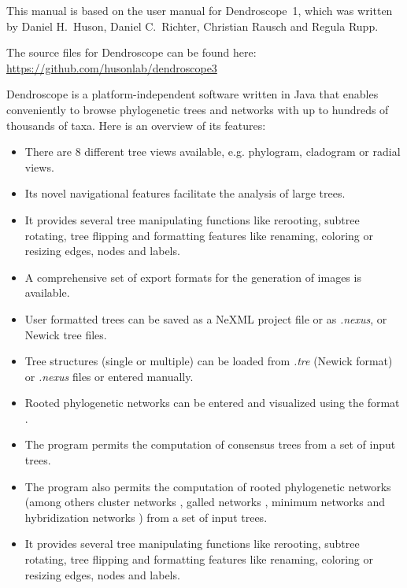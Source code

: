 \documentclass[11pt]{article}
\def\Dendroscope{{\sf Dendroscope }}
\begin{document}
This manual is based on the user manual for Dendroscope~1, which was written by
Daniel H.~Huson, Daniel C.~Richter, Christian Rausch and Regula Rupp.

The source files for \Dendroscope can be found here: \url{https://github.com/husonlab/dendroscope3}

\Dendroscope is a platform-independent software written in Java that enables conveniently to 
browse phylogenetic trees  and networks with up to hundreds of thousands of taxa.
Here is an overview of its features:
\begin{itemize}
\item There are 8 different tree views available, e.g. phylogram, cladogram or radial views.
\item Its novel navigational features facilitate the analysis of large trees.
\item It provides several tree manipulating functions like 
rerooting, subtree rotating, tree flipping and formatting features like renaming,
coloring or resizing edges, nodes and labels. 
\item A comprehensive set of export formats for the generation of images is available.
\item User formatted trees can be saved as a NeXML project file or as \textit{.nexus}, or Newick tree files. 
\item Tree structures (single or multiple) can be loaded from  \textit{.tre} (Newick format) or \textit{.nexus} files or entered manually.
\item Rooted phylogenetic networks can be entered and visualized using the  format \cite{Cardona2008}.
\item 
The program permits the computation of consensus trees  from a set of input trees.
\item The program also permits  the computation of rooted phylogenetic networks (among others cluster networks \cite{ClusterNetworks2008}, {galled networks} \cite{GalledNetworks2009}, {minimum networks} \cite{LevelKClusters2010} and hybridization networks  \cite{Albrecht2012,HusonLinz2015}) from a set of input trees.
\item It provides several tree manipulating functions like 
rerooting, subtree rotating, tree flipping and formatting features like renaming,
coloring or resizing edges, nodes and labels. 


\end{itemize}
\end{document}
